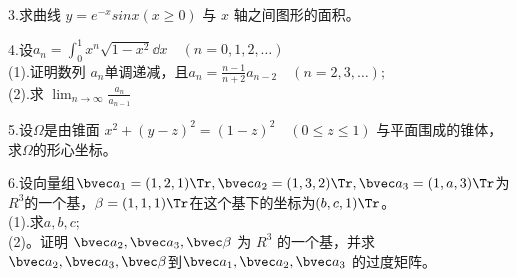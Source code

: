 3.求曲线 $y=e^{-x}sinx(x\geqslant 0)$ 与 $x$ 轴之间图形的面积。

4.设$a_n=\int_0^1 x^n \sqrt{1-x^2}\dd{x}\quad (n=0,1,2,\dots)$\\
(1).证明数列 ${a_n}$单调递减，且$\displaystyle a_n=\frac{n-1}{n+2}a_{n-2}\quad (n=2,3,\dots);$\\
(2).求 $\displaystyle \lim_{n \to \infty}\frac{a_n}{a_{n-1}}$

5.设$\Omega$是由锥面 $x^2+(y-z)^2=(1-z)^2 \quad (0\leqslant z \leqslant 1)$ 与平面围成的锥体，求$\Omega$的形心坐标。

6.设向量组$\bvec a_1=(1,2,1) \Tr,\bvec a_2=(1,3,2) \Tr,\bvec a_3=(1,a,3) \Tr$为$R^3$的一个基，$\beta=(1,1,1)\Tr$在这个基下的坐标为$(b,c,1) \Tr$。\\
(1).求$a,b,c$;\\
(2)。证明 $\bvec a_2,\bvec a_3,\bvec \beta$ 为 $R^3$ 的一个基，并求 $\bvec a_2,\bvec a_3,\bvec \beta$到$\bvec a_1,\bvec a_2,\bvec a_3$ 的过度矩阵。
